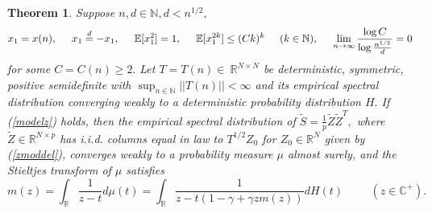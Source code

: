 \documentclass{article}
\newtheorem{theorem}{Theorem}
\numberwithin{equation}{section}
\begin{document}

\begin{theorem}\label{mainth2}
Suppose \(n,d \in \mathbb{N}, d<n^{1/2},\)%
\[x_1=x(n), \hspace{0.5cm} x_1 \overset{d}{=} -x_1,\hspace{0.5cm} \mathbb{E}[x_1^2]=1, \hspace{0.5cm} \mathbb{E}[x_1^{2k}] \leq (Ck)^k \hspace{0.5cm} (k \in \mathbb{N}), \hspace{0.5cm} \lim_{n \to \infty}{\frac{\log{C}}{\log{\frac{n^{1/2}}{d}}}}=0\]
for some \(C=C(n) \geq 2.\) Let \(T=T(n) \in~\mathbb{R}^{N \times N}\) be deterministic, symmetric, positive semidefinite with \(\sup_{n \in \mathbb{N}}{||T(n)||}<\infty\) and its empirical spectral distribution converging weakly to a deterministic probability distribution \(H.\) %
If (\ref{modelz}) holds, %
then the empirical spectral distribution of \(\tilde{S}=\frac{1}{p}\tilde{Z}\tilde{Z}^T,\) where \(\tilde{Z} \in \mathbb{R}^{N \times p}\) has i.i.d. columns equal in law to \(T^{1/2}Z_0\) for \(Z_0 \in \mathbb{R}^{N}\) given by (\ref{zmoddel}), converges weakly to a probability measure \(\mu\) almost surely, and the Stieltjes transform of \(\mu\) satisfies 
\begin{equation}\tag{\(IE\)}\label{steq}
    m(z)=\int_{\mathbb{R}}{\frac{1}{z-t}d\mu(t)}=\int_{\mathbb{R}}{\frac{1}{z-t(1-\gamma+\gamma z m(z))}dH(t)} \hspace{1cm} (z \in \mathbb{C}^+).
\end{equation}
\end{theorem}
\end{document}
